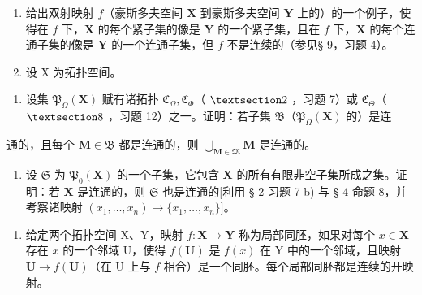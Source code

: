 \begin{enumerate}
\def\labelenumi{\arabic{enumi})}
\setcounter{enumi}{22}
\item
  给出双射映射 \(f\)（豪斯多夫空间 \(\mathbf{X}\) 到豪斯多夫空间 \(\mathbf{Y}\) 上的）的一个例子，使得在 \(f\) 下，\(\mathbf{X}\) 的每个紧子集的像是 \(\mathbf{Y}\) 的一个紧子集，且在 \(f\) 下，\(\mathbf{X}\) 的每个连通子集的像是 \(\mathbf{Y}\) 的一个连通子集，但 \(f\) 不是连续的（参见§ 9，习题 4）。
\item
  设 X 为拓扑空间。
\end{enumerate}

\begin{enumerate}
\def\labelenumi{\alph{enumi})}
\tightlist
\item
  设集 \(\mathfrak{P}_{\Omega}(\mathbf{X})\) 赋有诸拓扑 \(\mathfrak{C}_{\Omega}, \mathfrak{C}_{\Phi}\)（ \(\S 2\) ，习题 7）或 \(\mathfrak{C}_{\Theta}\)（ \(\S 8\) ，习题 12）之一。证明：若子集 \(\mathfrak{B}\)（\(\mathfrak{P}_{\Omega}(\mathbf{X})\) 的）是连
\end{enumerate}

通的，且每个 \(\mathbf{M} \in \mathfrak{B}\) 都是连通的，则 \(\bigcup_{\mathbf{M} \in \mathfrak{M}} \mathbf{M}\) 是连通的。

\begin{enumerate}
\def\labelenumi{\alph{enumi})}
\setcounter{enumi}{1}
\tightlist
\item
  设 \(\mathfrak{S}\) 为 \(\mathfrak{P}_{0}(\mathbf{X})\) 的一个子集，它包含 \(\mathbf{X}\) 的所有有限非空子集所成之集。证明：若 \(\mathbf{X}\) 是连通的，则 \(\mathfrak{S}\) 也是连通的{[}利用 § 2 习题 7 b) 与 § 4 命题 8，并考察诸映射 \((x_{1},\ldots ,x_{n})\to \{x_{1},\ldots ,x_{n}\} ]\)。
\end{enumerate}

\begin{enumerate}
\def\labelenumi{\arabic{enumi})}
\setcounter{enumi}{24}
\tightlist
\item
  给定两个拓扑空间 X、Y，映射 \(f: \mathbf{X} \to \mathbf{Y}\) 称为局部同胚，如果对每个 \(x \in \mathbf{X}\) 存在 \(x\) 的一个邻域 U，使得 \(f(\mathbf{U})\) 是 \(f(x)\) 在 Y 中的一个邻域，且映射 \(\mathbf{U} \to f(\mathbf{U})\)（在 U 上与 \(f\) 相合）是一个同胚。每个局部同胚都是连续的开映射。
\end{enumerate}

